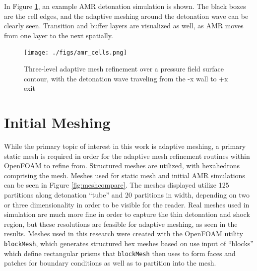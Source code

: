In Figure \ref{fig:examr}, an example AMR detonation simulation is shown. The black boxes are the cell edges, and the adaptive meshing around the detonation wave can be clearly seen. Transition and buffer layers are visualized as well, as AMR moves from one layer to the next spatially. 

\begin{figure}
\centering
\texttt{[image: ./figs/amr\_cells.png]}
\caption{Three-level adaptive mesh refinement over a pressure field surface contour, with the detonation wave traveling from the -x wall to +x exit}
\label{fig:examr}
\end{figure}






\section{Initial Meshing}
While the primary topic of interest in this work is adaptive meshing, a primary static mesh is required in order for the adaptive mesh refinement routines within OpenFOAM to refine from. Structured meshes are utilized, with hexahedrons comprising the mesh. Meshes used for static mesh and initial AMR simulations can be seen in Figure \ref{fig:meshcompare}. The meshes displayed utilize 125 partitions along detonation ``tube'' and 20 partitions in width, depending on two or three dimensionality in order to be visible for the reader. Real meshes used in simulation are much more fine in order to capture the thin detonation and shock region, but these resolutions are feasible for adaptive meshing, as seen in the results. Meshes used in this research were created with the OpenFOAM utility \verb|blockMesh|, which generates structured hex meshes based on use input of ``blocks'' which define rectangular prisms that \verb|blockMesh| then uses to form faces and patches for boundary conditions as well as to partition into the mesh. 

